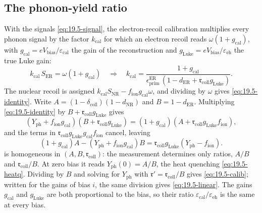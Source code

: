 \subsection{The phonon-yield ratio}

With the signals \cref{eq:19.5-signal}, the electron-recoil calibration multiplies every phonon signal by the factor $k_{\mathrm{cal}}$ for which an electron recoil reads $\omega(1 + g_{\mathrm{cal}})$, with $g_{\mathrm{cal}} = eV_{\mathrm{bias}}/\varepsilon_{\mathrm{cal}}$ the gain of the reconstruction and $g_{\mathrm{Luke}} = eV_{\mathrm{bias}}/\varepsilon_{\mathrm{eh}}$ the true Luke gain:
\begin{equation*}
  k_{\mathrm{cal}}\,S_{\mathrm{ER}} = \omega(1 + g_{\mathrm{cal}}) \quad\Longrightarrow\quad
  k_{\mathrm{cal}} = \frac{1 + g_{\mathrm{cal}}}{\epsilon^{\mathrm{ER}}_{\mathrm{prim}}\,(1 - d_{\mathrm{ER}} + \mathfrak{r}_{\mathrm{coll}}g_{\mathrm{Luke}})} .
\end{equation*}
The nuclear recoil is assigned $k_{\mathrm{cal}}S_{\mathrm{NR}} - f_{\mathrm{ion}}g_{\mathrm{cal}}\omega$, and dividing by $\omega$ gives \cref{eq:19.5-identity}. Write $A = (1 - \delta_{\mathrm{coll}})(1 - d_{\mathrm{NR}})$ and $B = 1 - d_{\mathrm{ER}}$. Multiplying \cref{eq:19.5-identity} by $B + \mathfrak{r}_{\mathrm{coll}}g_{\mathrm{Luke}}$ gives
\begin{equation*}
  (Y_{\mathrm{ph}} + f_{\mathrm{ion}}g_{\mathrm{cal}})(B + \mathfrak{r}_{\mathrm{coll}}g_{\mathrm{Luke}}) = (1 + g_{\mathrm{cal}})(A + \mathfrak{r}_{\mathrm{coll}}g_{\mathrm{Luke}}f_{\mathrm{ion}}) ,
\end{equation*}
and the terms in $\mathfrak{r}_{\mathrm{coll}}g_{\mathrm{Luke}}g_{\mathrm{cal}}f_{\mathrm{ion}}$ cancel, leaving
\begin{equation}
  (1 + g_{\mathrm{cal}})A - (Y_{\mathrm{ph}} + f_{\mathrm{ion}}g_{\mathrm{cal}})B = \mathfrak{r}_{\mathrm{coll}}g_{\mathrm{Luke}}(Y_{\mathrm{ph}} - f_{\mathrm{ion}}) .
  \label{eq:D.45-linear}
\end{equation}
 is homogeneous in $(A, B, \mathfrak{r}_{\mathrm{coll}})$: the measurement determines only ratios, $A/B$ and $\mathfrak{r}_{\mathrm{coll}}/B$. At zero bias it reads $Y_{\mathrm{ph}}(0) = A/B$, the heat quenching \cref{eq:19.5-heatq}. Dividing by $B$ and solving for $Y_{\mathrm{ph}}$ with $\mathfrak{r}' = \mathfrak{r}_{\mathrm{coll}}/B$ gives \cref{eq:19.5-calib}; written for the gains of bias $i$, the same division gives \cref{eq:19.5-linear}. The gains $g_{\mathrm{cal}}$ and $g_{\mathrm{Luke}}$ are both proportional to the bias, so their ratio $\varepsilon_{\mathrm{cal}}/\varepsilon_{\mathrm{eh}}$ is the same at every bias.

